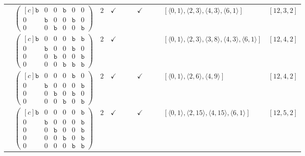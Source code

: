 \documentclass[12pt]{article}
\theoremstyle{definition}
\theoremstyle{plain}
\begin{document}
{\begin{longtable}{@{}cYcccccccZc@{}}
\cmidrule(lr){2-11}

& $\begin{pmatrix*}[c]
\mathtt{b}  &  0  &  0  &  \mathtt{b}  &  0  &  0  \\
0  &  \mathtt{b}  &  0  &  0  &  \mathtt{b}  &  0  \\
0  &  0  &  \mathtt{b}  &  0  &  0  &  \mathtt{b}
\end{pmatrix*}$
& $2$
& $\checkmark$
&
&
& $\checkmark$
&
&
& $[\langle0,1\rangle,\allowbreak\langle2,3\rangle,\allowbreak\langle4,3\rangle,\allowbreak\langle6,1\rangle]$
& $[12,3,2]$     \\

\cmidrule(lr){2-11}

& $\begin{pmatrix*}[c]
\mathtt{b}  &  0  &  0  &  0  &  \mathtt{b}  &  \mathtt{b}  \\
0  &  \mathtt{b}  &  0  &  0  &  \mathtt{b}  &  0  \\
0  &  0  &  \mathtt{b}  &  0  &  0  &  \mathtt{b}  \\
0  &  0  &  0  &  \mathtt{b}  &  \mathtt{b}  &  \mathtt{b}
\end{pmatrix*}$
& $2$
& $\checkmark$
&
&
&
&
&
& $[\langle0,1\rangle,\allowbreak\langle2,3\rangle,\allowbreak\langle3,8\rangle,\allowbreak\langle4,3\rangle,\allowbreak\langle6,1\rangle]$
& $[12,4,2]$     \\

\cmidrule(lr){2-11}

& $\begin{pmatrix*}[c]
\mathtt{b}  &  0  &  0  &  0  &  \mathtt{b}  &  0  \\
0  &  \mathtt{b}  &  0  &  0  &  0  &  \mathtt{b}  \\
0  &  0  &  \mathtt{b}  &  0  &  \mathtt{b}  & 0   \\
0  &  0  &  0  &  \mathtt{b}  &  0   &  \mathtt{b}
\end{pmatrix*}$
& $2$
& $\checkmark$
&
&
& $\checkmark$
&
&
& $[\langle0,1\rangle,\allowbreak\langle2,6\rangle,\allowbreak\langle4,9\rangle]$
& $[12,4,2]$\\

\cmidrule(lr){2-11}


& $\begin{pmatrix*}[c]
\mathtt{b}  &  0  &  0  &  0  &  0  &  \mathtt{b}  \\
0  &  \mathtt{b}  &  0  &  0  &  0  &  \mathtt{b}  \\
0  &  0  &  \mathtt{b}  &  0  &  0  & \mathtt{b}   \\
0  &  0  &  0  &  \mathtt{b}  &  0   &  \mathtt{b}  \\
0  &  0  &  0  &  0  &  \mathtt{b}   &  \mathtt{b}
\end{pmatrix*}$
& $2$
& $\checkmark$
&
&
& $\checkmark$
&
&
& $[\langle0,1\rangle,\allowbreak\langle2,15\rangle,\allowbreak\langle4,15\rangle,\allowbreak\langle6,1\rangle]$
& $[12,5,2]$  \\


\end{longtable}}
\end{document}
